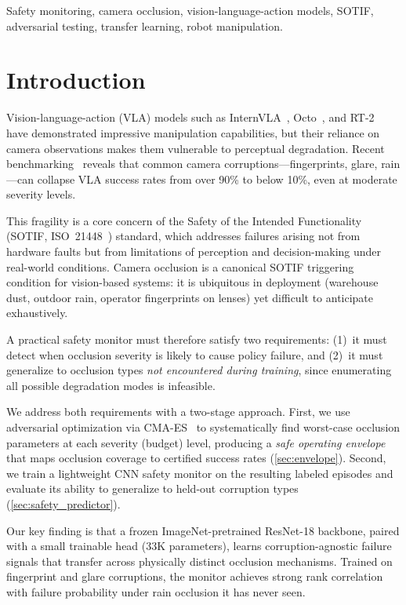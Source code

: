 \documentclass[letterpaper]{IEEEtran}
\begin{document}
\begin{IEEEkeywords}
Safety monitoring, camera occlusion, vision-language-action models, SOTIF, adversarial testing, transfer learning, robot manipulation.
\end{IEEEkeywords}

\section{Introduction}
\label{sec:intro}

Vision-language-action (VLA) models such as InternVLA~\cite{internvla}, Octo~\cite{octo}, and RT-2~\cite{rt2} have demonstrated impressive manipulation capabilities, but their reliance on camera observations makes them vulnerable to perceptual degradation.
Recent benchmarking~\cite{liberoplus} reveals that common camera corruptions---fingerprints, glare, rain---can collapse VLA success rates from over 90\% to below 10\%, even at moderate severity levels.

This fragility is a core concern of the Safety of the Intended Functionality (SOTIF, ISO~21448~\cite{iso21448}) standard, which addresses failures arising not from hardware faults but from limitations of perception and decision-making under real-world conditions.
Camera occlusion is a canonical SOTIF triggering condition for vision-based systems: it is ubiquitous in deployment (warehouse dust, outdoor rain, operator fingerprints on lenses) yet difficult to anticipate exhaustively.

A practical safety monitor must therefore satisfy two requirements: (1)~it must detect when occlusion severity is likely to cause policy failure, and (2)~it must generalize to occlusion types \emph{not encountered during training}, since enumerating all possible degradation modes is infeasible.

We address both requirements with a two-stage approach.
First, we use adversarial optimization via CMA-ES~\cite{cmaes} to systematically find worst-case occlusion parameters at each severity (budget) level, producing a \emph{safe operating envelope} that maps occlusion coverage to certified success rates (\cref{sec:envelope}).
Second, we train a lightweight CNN safety monitor on the resulting labeled episodes and evaluate its ability to generalize to held-out corruption types (\cref{sec:safety_predictor}).

Our key finding is that a frozen ImageNet-pretrained ResNet-18 backbone, paired with a small trainable head (33K parameters), learns corruption-agnostic failure signals that transfer across physically distinct occlusion mechanisms.
Trained on fingerprint and glare corruptions, the monitor achieves strong rank correlation with failure probability under rain occlusion it has never seen.
\end{document}
